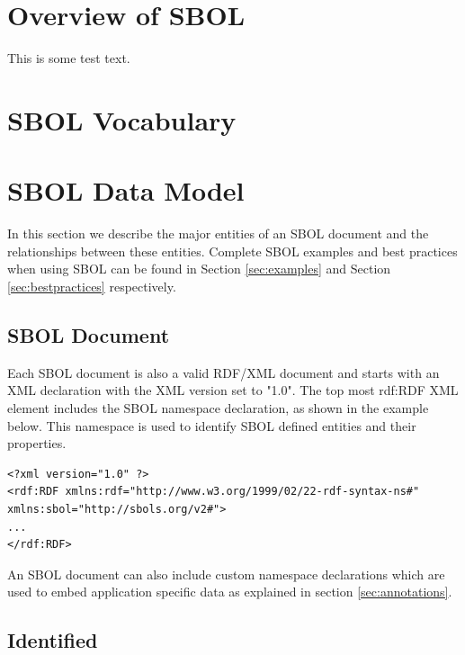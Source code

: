 \documentclass[draftspec]{sbmlpkgspec}
\newcommand{\lstsetsbol}{
 \lstset{language=sbol,
        tabsize=2
 }
}
\begin{document}
\section{Overview of SBOL}
This is some test text. 

\section{SBOL Vocabulary}

\section{SBOL Data Model}
In this section we describe the major entities of an SBOL document and the relationships between these entities. Complete SBOL examples and best practices when using SBOL can be found in Section \ref{sec:examples} and Section \ref{sec:bestpractices} respectively. 


\subsection {SBOL Document}
Each SBOL document is also a valid RDF/XML document and starts with an XML declaration with the XML version set to "1.0". The top most rdf:RDF XML element includes the SBOL namespace declaration, as shown in the example below. This namespace is used to identify SBOL defined entities and their properties.

\lstsetsbol
\begin{lstlisting}
<?xml version="1.0" ?>
<rdf:RDF xmlns:rdf="http://www.w3.org/1999/02/22-rdf-syntax-ns#" xmlns:sbol="http://sbols.org/v2#">
...
</rdf:RDF>
\end{lstlisting}

An SBOL document can also include custom namespace declarations which are used to embed application specific data as explained in section \ref{sec:annotations}.


\subsection {Identified}
\end{document}
